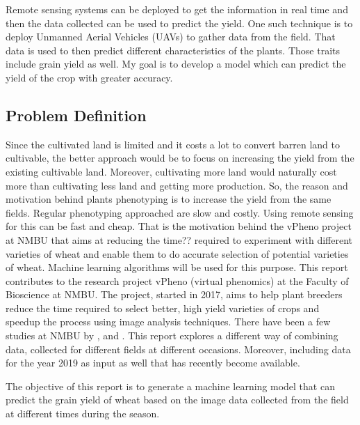 \documentclass[sigconf, nonacm, natbib, screen, balance=False]{acmart}
\begin{document}
Remote sensing systems can be deployed to get the information in real time and then the data collected can be used to predict the yield. One such technique is to deploy Unmanned Aerial Vehicles (UAVs) to gather data from the field. That data is used to then predict different characteristics of the plants. Those traits include grain yield as well. My goal is to develop a model which can predict the yield of the crop with greater accuracy.


\subsection{Problem Definition}\label{sec:problem_def}

Since the cultivated land is limited and it costs a lot to convert barren land to cultivable, the better approach would be to focus on increasing the yield from the existing cultivable land. Moreover, cultivating more land would naturally cost more than cultivating less land and getting more production. So, the reason and motivation behind plants phenotyping is to increase the yield from the same fields. Regular phenotyping approached are slow and costly. Using remote sensing for this can be fast and cheap. That is the motivation behind the vPheno project at NMBU that aims at reducing the time?? required to experiment with different varieties of wheat and enable them to do accurate selection of potential varieties of wheat. Machine learning algorithms will be used for this purpose.
This report contributes to the research project vPheno (virtual phenomics) at the Faculty of Bioscience at NMBU. The project, started in 2017, aims to help plant breeders reduce the time required to select better, high yield varieties of crops and speedup the process using image analysis techniques. There have been a few studies at NMBU by \citet{burud_bleken}, \citet{grindbakken} and \citet{lied}. This report explores a different way of combining data, collected for different fields at different occasions. Moreover, including data for the year 2019 as input as well that has recently become available.


The objective of this report is to generate a machine learning model that can predict the grain yield of wheat based on the image data collected from the field at different times during the season.
\end{document}
